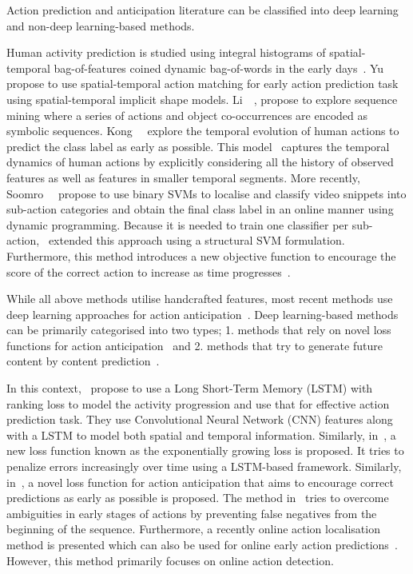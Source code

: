 Action prediction and anticipation literature can be classified into deep learning and non-deep learning-based methods. 

Human activity prediction is studied using integral histograms of spatial-temporal bag-of-features coined dynamic bag-of-words in the early days~\cite{ryoo2011human}. Yu~\etal~\cite{Yu2012} propose to use spatial-temporal action matching for early action prediction task using spatial-temporal implicit shape models. Li~\etal~\cite{Li2014}, propose to explore sequence mining where a series of actions and object co-occurrences are encoded as symbolic sequences. Kong~\etal~\cite{kong2014discriminative} explore the temporal evolution of human actions to predict the class label as early as possible. This model~\cite{kong2014discriminative} captures the temporal dynamics of human actions by explicitly considering all the history of observed features as well as features in smaller temporal segments. More recently, Soomro~\etal~\cite{soomro2016predicting} propose to use binary SVMs to localise and classify video snippets into sub-action categories and obtain the final class label in an online manner using dynamic programming. Because it is needed to train one classifier per sub-action,~\cite{soomro2016online} extended this approach using a structural SVM formulation. Furthermore, this method introduces a new objective function to encourage the score of the correct action to increase as time progresses~\cite{soomro2016online}.

While all above methods utilise handcrafted features, most recent methods use deep learning approaches for action anticipation~\cite{ma2016learning,aliakbarian2017encouraging,vondrick2016anticipating}. Deep learning-based methods can be primarily categorised into two types; 1. methods that rely on novel loss functions for action anticipation~\cite{ma2016learning,aliakbarian2017encouraging,jain2016recurrent} and 2. methods that try to generate future content by content prediction~\cite{vondrick2016anticipating}.

In this context,~\cite{ma2016learning} propose to use a Long Short-Term Memory (LSTM) with ranking loss to model the activity progression and use that for effective action prediction task. They use Convolutional Neural Network (CNN) features along with a LSTM to model both spatial and temporal information. Similarly, in~\cite{jain2016recurrent}, a new loss function known as the exponentially growing loss is proposed. It tries to penalize errors increasingly over time using a LSTM-based framework. Similarly, in~\cite{aliakbarian2017encouraging}, a novel loss function for action anticipation that aims to encourage correct predictions as early as possible is proposed. The method in~\cite{aliakbarian2017encouraging} tries to overcome ambiguities in early stages of actions by preventing false negatives from the beginning of the sequence. Furthermore, a recently online action localisation method is presented which can also be used for online early action predictions~\cite{Singh2017}. However, this method primarily focuses on online action detection.

